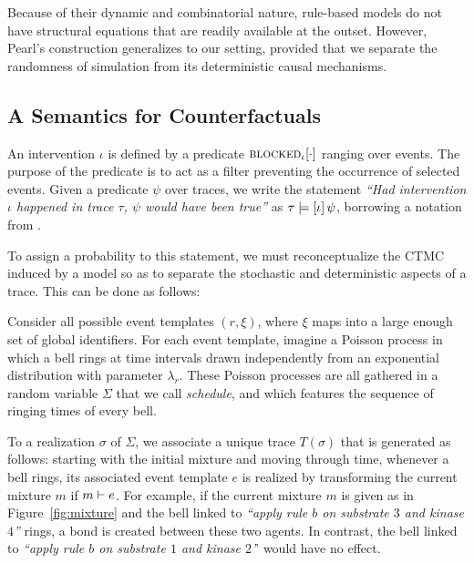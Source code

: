 Because of their dynamic and combinatorial nature, rule-based models do
not have structural equations that are readily available at the
outset. However, Pearl's construction generalizes to our setting,
provided that we separate the randomness of simulation from its
deterministic causal mechanisms.

\subsection{A Semantics for Counterfactuals}
\label{subsec:counterfactuals-semantics}

An intervention $\iota$ is defined by a predicate
${\textsc{blocked}}_{\iota}[\cdot]$ ranging over events. The purpose of the
predicate is to act as a filter preventing the occurrence of selected
events. Given a predicate $\psi$ over traces, we write the statement
\textit{``Had intervention $\iota$ happened in trace $\tau$, $\psi$
  would have been true''} as $\tau \models [\iota] \, \psi{}$, borrowing a notation from
\cite{halpern2016actual}.

To assign a probability to this statement, we must
reconceptualize the CTMC induced by a model so as to
separate the stochastic and deterministic aspects of a trace.
This can be done as follows:
\begin{inparaenum}[(i)]
\item Consider all possible event templates $(r, \xi)$, where $\xi$
  maps into a large enough set of global identifiers. For each event
  template, imagine a Poisson process in which a bell rings at time
  intervals drawn independently from an exponential distribution with
  parameter $\lambda_r$. These Poisson processes are all gathered in a
  random variable $\Sigma$ that we call \emph{schedule}, and which
  features the sequence of ringing times of every bell.
\item
  To a realization $\sigma$ of $\Sigma$, we associate a unique
  trace $T(\sigma)$ that is generated as follows: starting with the
  initial mixture and moving through time, whenever a bell rings, its
  associated event template $e$ is realized by transforming the
  current mixture $m$ if $m \vdash e$. For
  example, if the current mixture $m$ is given as in
  Figure~\ref{fig:mixture} and the bell linked to \textit{``apply rule
    $b$ on substrate $3$ and kinase $4$''} rings, a bond is created
  between these two agents. In contrast, the bell linked to
  \textit{``apply rule $b$ on substrate $1$ and kinase $2$'}' would
  have no effect.
\end{inparaenum}


